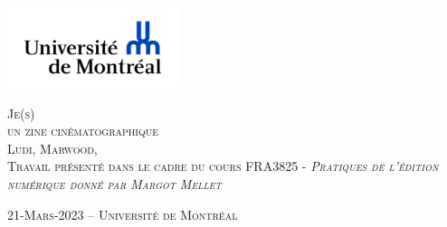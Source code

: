 \documentclass[12pt,french,letterpaper]{article}
\subtitle{un zine cinématographique}
\author{Ludi    Marwood    Université de Montréal }
\date{}
\begin{document}

\begin{titlepage}%
\begin{center}
    \enlargethispage{2cm}
    
\includegraphics[width = 50mm]{logo} %

\vspace*{3cm}
\scshape\Huge Je(s)\\
\normalfont\Large un zine cinématographique\\
\large \vspace*{3cm}
Ludi,  Marwood,  
\\
\normalsize\vspace*{1cm}Travail présenté dans le cadre du cours FRA3825 - \em Pratiques
de l'édition numérique
 \normalfont donné par Margot Mellet 

\vspace*{3cm}
\end{center}

\vspace*{\fill}
\begin{flushright}
\end{flushright}

\begin{center}
\scshape\normalsize\vspace*{1cm} 21-Mars-2023 --      Université de
Montréal 
\\
\end{center}
\end{titlepage}




\newpage 
\end{document}
